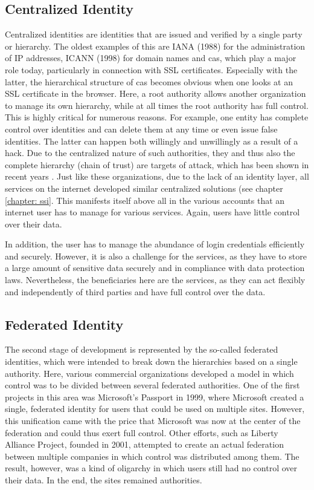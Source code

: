 	    \subsection{Centralized Identity}
	    Centralized identities are identities that are issued and verified by a single party or hierarchy. The oldest examples of this are IANA (1988) for the administration of IP addresses, ICANN (1998) for domain names and \acfp{ca}, which play a major role today, particularly in connection with SSL certificates. Especially with the latter, the hierarchical structure of \acp{ca} becomes obvious when one looks at an SSL certificate in the browser. Here, a root authority allows another organization to manage its own hierarchy, while at all times the root authority has full control. This is highly critical for numerous reasons. For example, one entity has complete control over identities and can delete them at any time or even issue false identities. The latter can happen both willingly and unwillingly as a result of a hack. Due to the centralized nature of such authorities, they and thus also the complete hierarchy (chain of trust) are targets of attack, which has been shown in recent years \cite{borchers_diginotar-ssl-gau_2012}. Just like these organizations, due to the lack of an identity layer, all services on the internet developed similar centralized solutions (see chapter \ref{chapter: ssi}. This manifests itself above all in the various accounts that an internet user has to manage for various services. Again, users have little control over their data. \cite{allen_path_2016}
	    
	    In addition, the user has to manage the abundance of login credentials efficiently and securely. However, it is also a challenge for the services, as they have to store a large amount of sensitive data securely and in compliance with data protection laws. Nevertheless, the beneficiaries here are the services, as they can act flexibly and independently of third parties and have full control over the data. \cite[p. 6]{ehrlich_self-sovereign_2021}
	    
	    
	    \subsection{Federated Identity}
	    
	    The second stage of development is represented by the so-called federated identities, which were intended to break down the hierarchies based on a single authority. Here, various commercial organizations developed a model in which control was to be divided between several federated authorities. One of the first projects in this area was Microsoft's Passport in 1999, where Microsoft created a single, federated identity for users that could be used on multiple sites. However, this unification came with the price that Microsoft was now at the center of the federation and could thus exert full control. Other efforts, such as Liberty Alliance Project, founded in 2001, attempted to create an actual federation between multiple companies in which control was distributed among them. The result, however, was a kind of oligarchy in which users still had no control over their data. In the end, the sites remained authorities. \cite{allen_path_2016}
	    
